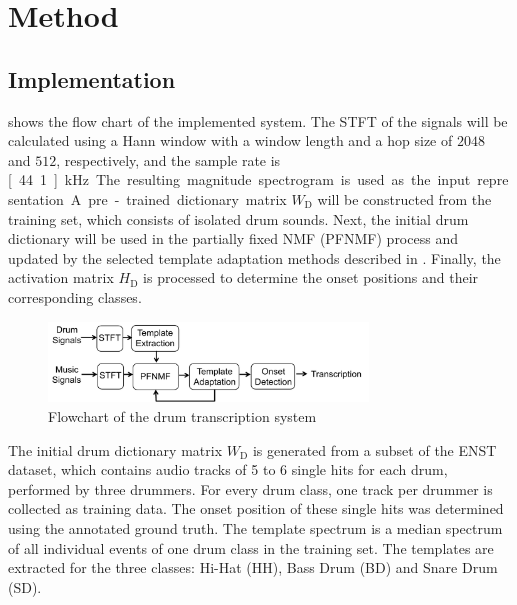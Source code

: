 \documentclass{article}
\begin{document}
\section{Method}\label{sec:method}
\subsection{Implementation}\label{subsec:processing steps}

 shows the flow chart of the implemented system. The STFT of the signals will be calculated using a Hann window with a window length and a hop size of $2048$ and $512$, respectively, and the sample rate is \unit[44.1]{kHz}. The resulting magnitude spectrogram is used as the input representation. 
A pre-trained dictionary matrix $W_\mathrm{D}$ will be constructed from the training set, which consists of isolated drum sounds. 
Next, the initial drum dictionary will be used in the partially fixed NMF (PFNMF) process and updated by the selected template adaptation methods described in . Finally, the activation matrix $H_\mathrm{D}$ is processed to determine the onset positions and their corresponding classes. 

\begin{figure}
 \centerline{%
 \includegraphics[width=8.5cm]{flow.pdf}}%
 \caption{Flowchart of the drum transcription system}
 \label{fig:flowchart}
\end{figure}

The initial drum dictionary matrix $W_\mathrm{D}$ is generated from a subset of the ENST dataset, which contains audio tracks of 5 to 6 single hits for each drum, performed by three drummers. For every drum class, one track per drummer is collected as training data. The onset position of these single hits was determined using the annotated ground truth. The template spectrum is a median spectrum of all individual events of one drum class in the training set. The templates are extracted for the three classes: Hi-Hat (HH), Bass Drum (BD) and Snare Drum (SD).   
\end{document}
